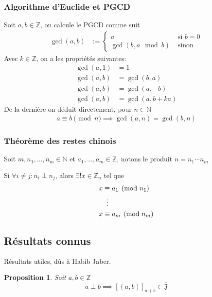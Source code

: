 \documentclass{article}
\newtheorem{proposition}{Proposition}
\begin{document}
\subsubsection{Algorithme d'Euclide et PGCD}

Soit $a, b \in \mathbb{Z}$, on calcule le PGCD comme suit
\begin{align*}
    \gcd(a, b) & := \begin{cases}
        a & \text{ si $b = 0$} \\
        \gcd(b, a \mod b) & \text{ sinon}
    \end{cases}
\end{align*}
Avec $k \in \mathbb{Z}$, on a les propriétés suivantes:
\begin{align*}
    \gcd(a, 1) & = 1 \\
    \gcd(a, b) & = \gcd(b, a) \\
    \gcd(a, b) &= \gcd(a, -b) \\
    \gcd(a, b) & = \gcd(a, b + ka)
\end{align*}
De la dernière on déduit directement, pour $n \in \mathbb{N}$
\begin{align*}
        a \equiv b \pmod n \implies \gcd(a, n) = \gcd(b, n)
\end{align*}

\subsubsection{Théorème des restes chinois}

Soit $m, n_1, \dots, n_m \in \mathbb{N}$ et $a_1, \dots, a_m \in \mathbb{Z}$, notons le produit $n = n_1 \cdots n_m$

Si $\forall i \neq j : n_i \perp n_j$, alors $\exists!x \in \mathbb{Z}_n$ tel que
\begin{align*}
    x &\equiv a_1 \pmod {n_1} \\
    &\vdotswithin{\equiv} \\
    x &\equiv a_m \pmod {n_m}
\end{align*}

\newpage

\subsection{Résultats connus}
Résultats utiles, dûs à Habib Jaber.

\begin{proposition}
    Soit $a, b \in \mathbb{Z}$
    \[ a \perp b \implies {[(a, b)]}_{a + b} \in \overline{\mathfrak{J}} \]
\end{proposition}
\end{document}
